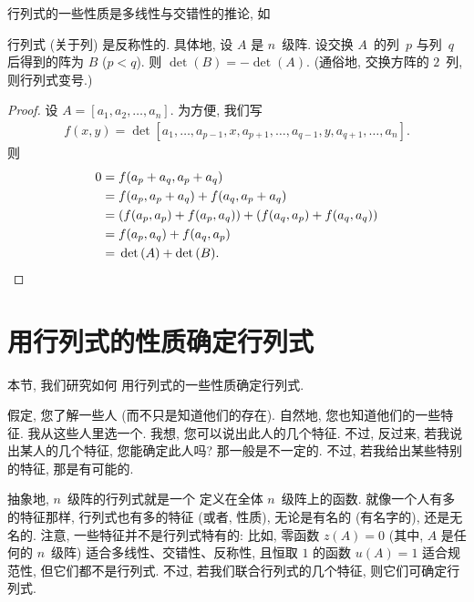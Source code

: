 \documentclass[../libro.tex]{subfiles}
\begin{document}
行列式的一些性质是多线性与交错性的推论,
如

\begin{theorem}[反称性]
    行列式 (关于列) 是反称性的.
    具体地,
    设 \(A\) 是 \(n\)~级阵.
    设交换 \(A\)~的列~\(p\) 与列~\(q\) 后得到的阵为 \(B\)
    (\(p < q\)).
    则 \(\det {(B)} = -\det {(A)}\).
    (通俗地, 交换方阵的 \(2\)~列, 则行列式变号.)
\end{theorem}

\begin{proof}
    设 \(A = [a_1, a_2, \dots, a_n]\).
    为方便, 我们写
    \begin{align*}
        f(x, y)
        = \det {[a_1, \dots, a_{p-1}, x, a_{p+1}, \dots,
        a_{q-1}, y, a_{q+1}, \dots, a_n]}.
    \end{align*}
    则
    \begin{align*}
        0
        = {} & f(a_p + a_q, a_p + a_q)               \\
        = {} & f(a_p, a_p + a_q) + f(a_q, a_p + a_q) \\
        = {} & (f(a_p, a_p) + f(a_p, a_q))
        + (f(a_q, a_p) + f(a_q, a_q))                \\
        = {} & f(a_p, a_q) + f(a_q, a_p)             \\
        = {} & \det {(A)} + \det {(B)}.
        \qedhere
    \end{align*}
\end{proof}

\section{用行列式的性质确定行列式}

本节, 我们研究如何%
用行列式的一些性质确定行列式.

假定, 您了解一些人
(而不只是知道他们的存在).
自然地, 您也知道他们的一些特征.
我从这些人里选一个.
我想, 您可以说出此人的几个特征.
不过, 反过来,
若我说出某人的几个特征,
您能确定此人吗?
那一般是不一定的.
不过, 若我给出某些特别的特征,
那是有可能的.

抽象地, \(n\)~级阵的行列式就是一个%
定义在全体 \(n\)~级阵上的函数.
就像一个人有多的特征那样,
行列式也有多的特征 (或者, 性质),
无论是有名的 (有名字的),
还是无名的.
注意,
一些特征并不是行列式特有的:
比如, 零函数 \(z(A) = 0\)
(其中, \(A\) 是任何的 \(n\)~级阵)
适合多线性、交错性、反称性,
且恒取 \(1\) 的函数 \(u(A) = 1\)
适合规范性,
但它们都不是行列式.
不过, 若我们联合行列式的几个特征,
则它们可确定行列式.
\end{document}
